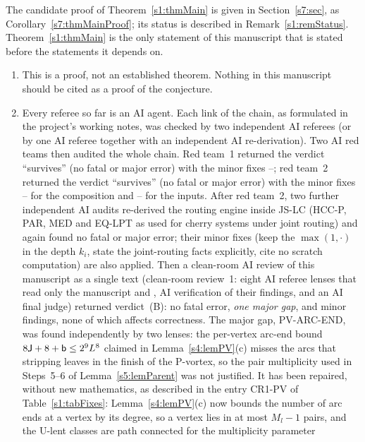 The candidate proof of Theorem~\ref{s1:thmMain} is given in
Section~\ref{s7:sec}, as Corollary~\ref{s7:thmMainProof}; its status is
described in Remark~\ref{s1:remStatus}. Theorem~\ref{s1:thmMain} is the only
statement of this manuscript that is stated before the statements it depends
on.

\begin{remark}\label{s1:remStatus}
\begin{enumerate}
\item[(i)] This is a \candidate{} proof, not an established theorem. Nothing in
this manuscript should be cited as a proof of the \EG{} conjecture.

\item[(ii)] Every referee so far is an AI agent. Each link of the chain, as
formulated in the project's working notes, was checked by two independent AI
referees (or by one AI referee together with an independent AI re-derivation).
Two AI red teams then audited the whole chain. Red team~1 returned the verdict
``survives'' (no fatal or major error) with the minor fixes
--; red team~2 returned the verdict ``survives'' (no fatal or
major error) with the minor fixes -- for the composition and
-- for the inputs. After red team~2, two further independent
AI audits re-derived the routing engine inside JS-LC (HCC-P, PAR, MED and EQ-LPT
as used for cherry systems under joint routing) and again found no fatal or
major error; their minor fixes (keep the $\max(1,\cdot)$ in the depth $k_i$,
state the joint-routing facts explicitly, cite no scratch computation) are also
applied. Then a clean-room AI review of this manuscript as a single text
(clean-room review~1: eight AI referee lenses that read only the manuscript and
\cite{BM}, AI verification of their findings, and an AI final judge) returned
verdict~(B): no fatal error, \emph{one major gap}, and minor findings, none of
which affects correctness. The major gap, PV-ARC-END, was found independently by
two lenses: the per-vertex arc-end bound $8\mathsf{J}+8+\mathsf{b}\le2^9L^8$ claimed in
Lemma~\ref{s4:lemPV}(c) misses the arcs that stripping leaves in the finish of
the P-vortex, so the pair multiplicity used in Steps~5--6 of
Lemma~\ref{s5:lemParent} was not justified. It has been repaired, without new
mathematics, as described in the entry \textsf{CR1-PV} of
Table~\ref{s1:tabFixes}: Lemma~\ref{s4:lemPV}(c) now bounds the number of arc
ends at a vertex by its degree, so a vertex lies in at most $M_l-1$ pairs, and
the U-lent classes are path connected for the multiplicity parameter

\end{enumerate}
\end{remark}

